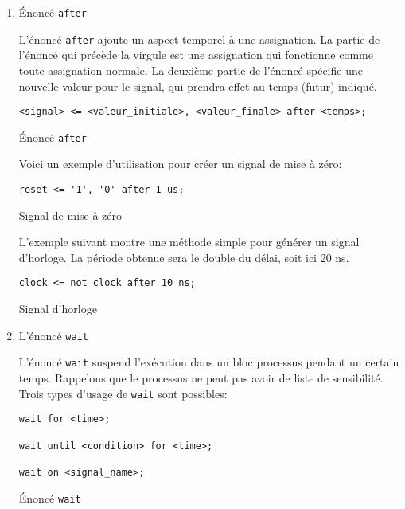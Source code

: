 \documentclass[letter, oneside]{book}
\begin{document}
\begin{enumerate}
\item Énoncé \texttt{after}
\label{sec:orge961859}

L'énoncé \texttt{after} ajoute un aspect temporel à une assignation. La
partie de l'énoncé qui précède la virgule est une assignation qui
fonctionne comme toute assignation normale. La deuxième partie de
l'énoncé spécifie une nouvelle valeur pour le signal, qui prendra effet
au temps (futur) indiqué.

\begin{listing}[htbp]
\begin{verbatim}
<signal> <= <valeur_initiale>, <valeur_finale> after <temps>;
\end{verbatim}
\caption{Énoncé \texttt{after}}
\end{listing}

Voici un exemple d'utilisation pour créer un signal de mise à zéro:

\begin{listing}[htbp]
\begin{verbatim}
reset <= '1', '0' after 1 us;
\end{verbatim}
\caption{Signal de mise à zéro}
\end{listing}

L'exemple suivant montre une méthode simple pour générer un signal
d'horloge. La période obtenue sera le double du délai, soit ici 20 ns.

\begin{listing}[htbp]
\begin{verbatim}
clock <= not clock after 10 ns;
\end{verbatim}
\caption{Signal d'horloge}
\end{listing}

\item L'énoncé \texttt{wait}
\label{sec:org3e9ff07}

L'énoncé \texttt{wait} suspend l'exécution dans un bloc processus pendant un
certain temps. Rappelons que le processus ne peut pas avoir de liste
de sensibilité. Trois types d'usage de \texttt{wait} sont possibles:

\begin{listing}[htbp]
\begin{verbatim}
wait for <time>; 

wait until <condition> for <time>;

wait on <signal_name>;
\end{verbatim}
\caption{Énoncé \texttt{wait}}
\end{listing}


\end{enumerate}
\end{document}
